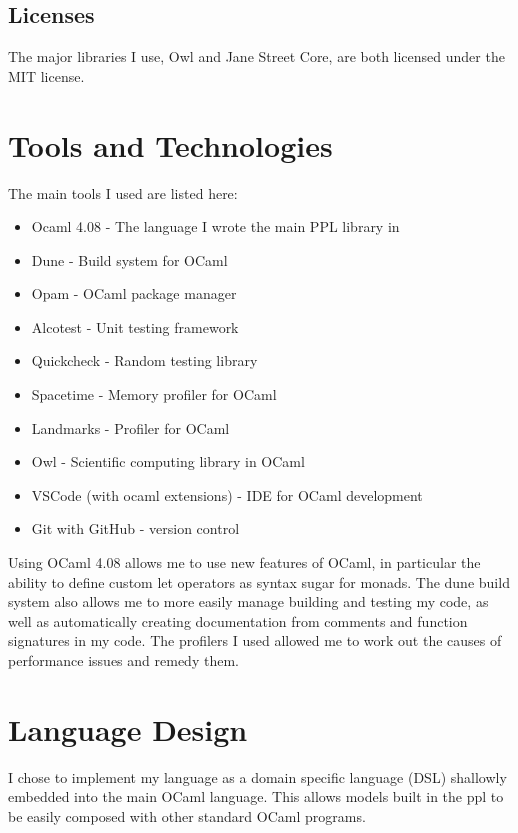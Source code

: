 \subsection{Licenses}

The major libraries I use, Owl and Jane Street Core, are both licensed under the MIT license.

\section{Tools and Technologies}
The main tools I used are listed here:
\begin{itemize}
	\item Ocaml 4.08 - The language I wrote the main PPL library in
	\item Dune - Build system for OCaml
	\item Opam - OCaml package manager
	\item Alcotest - Unit testing framework
	\item Quickcheck - Random testing library
	\item Spacetime - Memory profiler for OCaml
	\item Landmarks - Profiler for OCaml
	\item Owl - Scientific computing library in OCaml
	\item VSCode (with ocaml extensions) - IDE for OCaml development
	\item Git with GitHub - version control
\end{itemize}

Using OCaml 4.08 allows me to use new features of OCaml, in particular the ability to define custom let operators as syntax sugar for monads. The dune build system also allows me to more easily manage building and testing my code, as well as automatically creating documentation from comments and function signatures in my code. The profilers I used allowed me to work out the causes of performance issues and remedy them. 

\section{Language Design}
I chose to implement my language as a domain specific language (DSL) shallowly embedded into the main OCaml language. This allows models built in the ppl to be easily composed with other standard OCaml programs.

